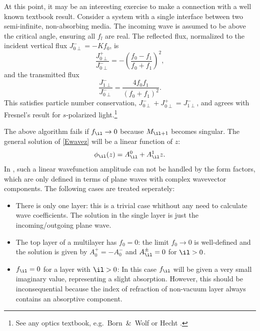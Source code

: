 At this point,
it may be an interesting exercise to make
 a connection with a well known textbook result.
Consider a system
with a single interface between two semi-infinite,
non-absorbing media. The incoming wave is assumed to be above the
critical angle, ensuring all $f_l$ are real.
The reflected flux,
normalized to the incident vertical flux $J_{0\perp}^-=-Kf_0$, is
%
\begin{equation}\label{EJrefl}
  \frac{J_{0\perp}^+}{J_{0\perp}^-}
  = - \left(\frac{f_0-f_1}{f_0+f_1}\right)^2,
\end{equation}
and the transmitted flux
%
\begin{equation}\label{EJtran}
  \frac{J_{1\perp}^-}{J_{0\perp}^-}
  = \frac{4f_0 f_1}{(f_0+f_1)^2}.
\end{equation}
This satisfies particle number conservation, $J_{0\perp}^-+J_{0\perp}^+=J_{1\perp}^-$,
and agrees with Fresnel's result for $s$-polarized light.\footnote
{See any optics textbook, e.g.\ Born~\&~Wolf \cite[ch.~1.5.2]{BoWo99}
  or Hecht \cite[ch.~4.6.2]{Hec02}.}

The above algorithm fails if $f_{\il}\to0$
because $M_{\il+1}$ becomes singular.
The general solution of \cref{Ewavez} will be a linear function of $z$:
\begin{equation}\label{Ephilz}
  \phi_{\il}(z) = A^0_{\il} + A^1_{\il}z.
\end{equation}
In \BornAgain, such a linear wavefunction amplitude can not be handled by the form factors,
which are only defined in terms of plane waves with complex wavevector components.
The following cases are treated seperately:
\begin{itemize}
  \item There is only one layer: this is a trivial case whithout any need to calculate wave coefficients.
    The solution in the single layer is just the incoming/outgoing plane wave.
  \item The top layer of a multilayer has $f_0=0$: the limit $f_0\to0$ is well-defined and the
    solution is given by $A^+_0 = -A^-_0$ and $A^{\pm}_{\il}=0$ for $\il>0$.
  \item $f_{\il}=0$ for a layer with $\il>0$: In this case $f_{\il}$ will be given a very small imaginary value,
    representing a slight absorption. However, this should be inconsequential because the index of refraction
    of non-vacuum layer always contains an absorptive component.
\end{itemize}

